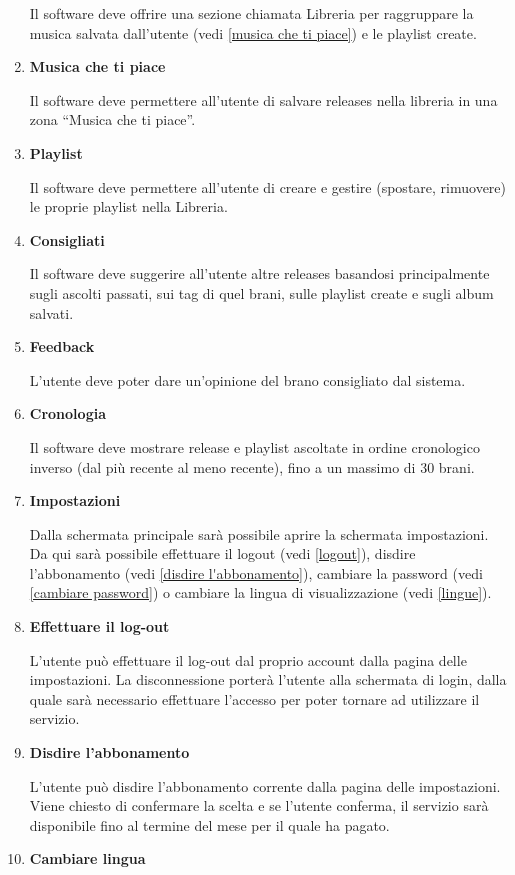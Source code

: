 \documentclass[a4paper,12pt]{article}
\begin{document}
\begin{enumerate}[label=\textbf{RF\arabic*}\;, ref=\textbf{RF\arabic*}]
    Il software deve offrire una sezione chiamata Libreria per raggruppare la musica salvata dall’utente (vedi \ref{musica che ti piace}) e le playlist create.

    \item \label{musica che ti piace} \textbf{Musica che ti piace}
    
    Il software deve permettere all’utente di salvare releases nella libreria in una zona “Musica che ti piace”.
    \item \label{playlist} \textbf{Playlist}
    
    Il software deve permettere all’utente di creare e gestire (spostare, rimuovere) le proprie playlist nella Libreria.
    \item \label{consigliati} \textbf{Consigliati}
    
    Il software deve suggerire all’utente altre releases basandosi principalmente sugli ascolti passati, sui tag di quel brani, sulle playlist create e sugli album salvati.
    \item \label{feedback} \textbf{Feedback}
    
    L’utente deve poter dare un’opinione del brano consigliato dal sistema.
    \item \label{cronologia} \textbf{Cronologia}
    
    Il software deve mostrare release e playlist ascoltate in ordine cronologico inverso (dal più recente al meno recente), fino a un massimo di 30 brani.
    \item \label{impostazioni} \textbf{Impostazioni}
    
    Dalla schermata principale sarà possibile aprire la schermata impostazioni. Da qui sarà possibile effettuare il logout (vedi \ref{logout}), disdire l'abbonamento (vedi \ref{disdire l'abbonamento}), cambiare la password (vedi \ref{cambiare password}) o cambiare la lingua di visualizzazione (vedi \ref{lingue}).
    \item \label{logout} \textbf{Effettuare il log-out}
    
    L'utente può effettuare il log-out dal proprio account dalla pagina delle impostazioni. La disconnessione porterà l'utente alla schermata di login, dalla quale sarà necessario effettuare l'accesso per poter tornare ad utilizzare il servizio.
    \item \label{disdire l'abbonamento} \textbf{Disdire l'abbonamento}
    
    L'utente può disdire l'abbonamento corrente dalla pagina delle impostazioni. Viene chiesto di confermare la scelta e se l’utente conferma, il servizio sarà disponibile fino al termine del mese per il quale ha pagato.
    \item \label{lingue} \textbf{Cambiare lingua}
    

\end{enumerate}
\end{document}
